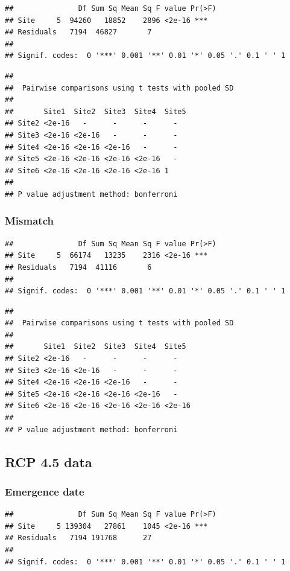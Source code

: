 \documentclass[12 pt]{article}
\begin{document}
\begin{verbatim}
##               Df Sum Sq Mean Sq F value Pr(>F)    
## Site     5  94260   18852    2896 <2e-16 ***
## Residuals   7194  46827       7                   
## 
## Signif. codes:  0 '***' 0.001 '**' 0.01 '*' 0.05 '.' 0.1 ' ' 1
\end{verbatim}

\begin{verbatim}
## 
##  Pairwise comparisons using t tests with pooled SD 
## 
##       Site1  Site2  Site3  Site4  Site5
## Site2 <2e-16   -      -      -      -    
## Site3 <2e-16 <2e-16   -      -      -    
## Site4 <2e-16 <2e-16 <2e-16   -      -    
## Site5 <2e-16 <2e-16 <2e-16 <2e-16   -    
## Site6 <2e-16 <2e-16 <2e-16 <2e-16 1    
## 
## P value adjustment method: bonferroni
\end{verbatim}

\subsubsection*{Mismatch}

\begin{verbatim}
##               Df Sum Sq Mean Sq F value Pr(>F)    
## Site     5  66174   13235    2316 <2e-16 ***
## Residuals   7194  41116       6                   
## 
## Signif. codes:  0 '***' 0.001 '**' 0.01 '*' 0.05 '.' 0.1 ' ' 1
\end{verbatim}

\begin{verbatim}
## 
##  Pairwise comparisons using t tests with pooled SD 
##  
##       Site1  Site2  Site3  Site4  Site5 
## Site2 <2e-16   -      -      -      -     
## Site3 <2e-16 <2e-16   -      -      -     
## Site4 <2e-16 <2e-16 <2e-16   -      -     
## Site5 <2e-16 <2e-16 <2e-16 <2e-16   -     
## Site6 <2e-16 <2e-16 <2e-16 <2e-16 <2e-16
## 
## P value adjustment method: bonferroni
\end{verbatim}

\subsection{RCP 4.5 data}
\subsubsection*{Emergence date}

\begin{verbatim}
##               Df Sum Sq Mean Sq F value Pr(>F)    
## Site     5 139304   27861    1045 <2e-16 ***
## Residuals   7194 191768      27                   
## 
## Signif. codes:  0 '***' 0.001 '**' 0.01 '*' 0.05 '.' 0.1 ' ' 1
\end{verbatim}
\end{document}
